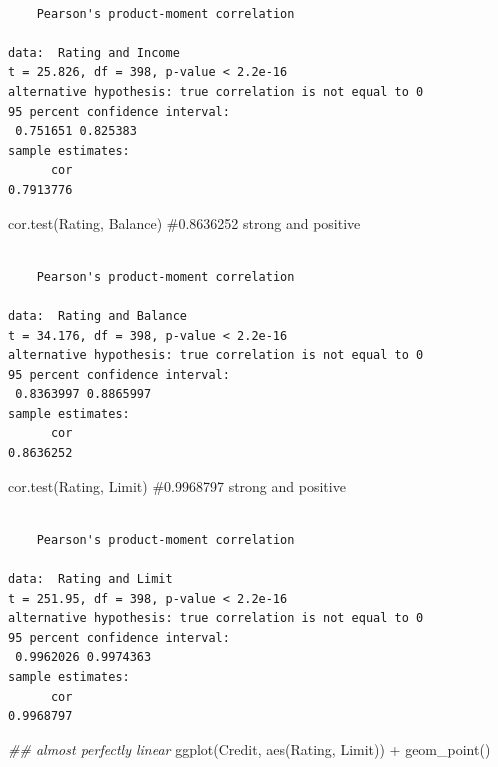 \documentclass[
  letterpaper,
  DIV=11,
  numbers=noendperiod]{scrreprt}
\newenvironment{Shaded}{\begin{snugshade}}{\end{snugshade}}
\newcommand{\CommentTok}[1]{\textcolor[rgb]{0.37,0.37,0.37}{#1}}
\newcommand{\DocumentationTok}[1]{\textcolor[rgb]{0.37,0.37,0.37}{\textit{#1}}}
\newcommand{\FunctionTok}[1]{\textcolor[rgb]{0.28,0.35,0.67}{#1}}
\newcommand{\NormalTok}[1]{\textcolor[rgb]{0.00,0.23,0.31}{#1}}
\newcommand{\SpecialCharTok}[1]{\textcolor[rgb]{0.37,0.37,0.37}{#1}}
\begin{document}
\begin{verbatim}

    Pearson's product-moment correlation

data:  Rating and Income
t = 25.826, df = 398, p-value < 2.2e-16
alternative hypothesis: true correlation is not equal to 0
95 percent confidence interval:
 0.751651 0.825383
sample estimates:
      cor 
0.7913776 
\end{verbatim}

\begin{Shaded}
\begin{Highlighting}[]
\FunctionTok{cor.test}\NormalTok{(Rating, Balance)  }\CommentTok{\#0.8636252 strong and positive}
\end{Highlighting}
\end{Shaded}

\begin{verbatim}

    Pearson's product-moment correlation

data:  Rating and Balance
t = 34.176, df = 398, p-value < 2.2e-16
alternative hypothesis: true correlation is not equal to 0
95 percent confidence interval:
 0.8363997 0.8865997
sample estimates:
      cor 
0.8636252 
\end{verbatim}

\begin{Shaded}
\begin{Highlighting}[]
\FunctionTok{cor.test}\NormalTok{(Rating, Limit)  }\CommentTok{\#0.9968797 strong and positive}
\end{Highlighting}
\end{Shaded}

\begin{verbatim}

    Pearson's product-moment correlation

data:  Rating and Limit
t = 251.95, df = 398, p-value < 2.2e-16
alternative hypothesis: true correlation is not equal to 0
95 percent confidence interval:
 0.9962026 0.9974363
sample estimates:
      cor 
0.9968797 
\end{verbatim}

\begin{Shaded}
\begin{Highlighting}[]
\DocumentationTok{\#\# almost perfectly linear}
\FunctionTok{ggplot}\NormalTok{(Credit, }\FunctionTok{aes}\NormalTok{(Rating, Limit)) }\SpecialCharTok{+} \FunctionTok{geom\_point}\NormalTok{()}
\end{Highlighting}
\end{Shaded}
\end{document}
